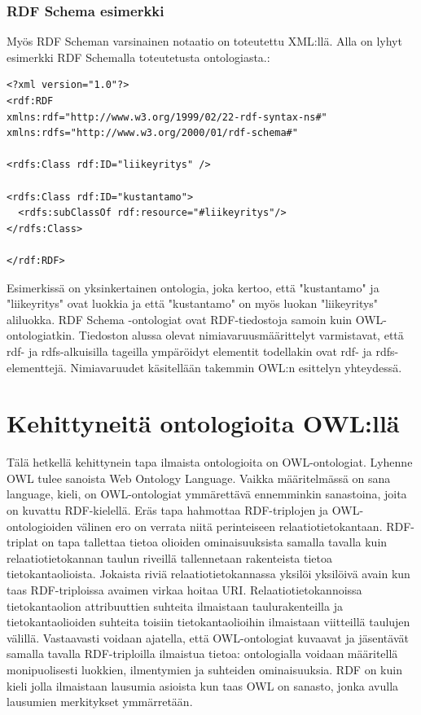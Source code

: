 \documentclass[finnish]{tktltiki2}
\theoremstyle{definition}
\theoremstyle{remark}
\begin{document}
\subsubsection{RDF Schema esimerkki}
Myös RDF Scheman varsinainen notaatio on toteutettu XML:llä. Alla on lyhyt esimerkki RDF Schemalla toteutetusta ontologiasta.: 
\begin{verbatim}
<?xml version="1.0"?>
<rdf:RDF
xmlns:rdf="http://www.w3.org/1999/02/22-rdf-syntax-ns#"
xmlns:rdfs="http://www.w3.org/2000/01/rdf-schema#"

<rdfs:Class rdf:ID="liikeyritys" />

<rdfs:Class rdf:ID="kustantamo">
  <rdfs:subClassOf rdf:resource="#liikeyritys"/>
</rdfs:Class>

</rdf:RDF>
\end{verbatim}

Esimerkissä on yksinkertainen ontologia, joka kertoo, että "kustantamo" ja "liikeyritys" ovat luokkia ja että "kustantamo" on myös luokan "liikeyritys" aliluokka. RDF Schema  -ontologiat ovat RDF-tiedostoja samoin kuin OWL-ontologiatkin. Tiedoston alussa olevat nimiavaruusmäärittelyt varmistavat, että rdf- ja rdfs-alkuisilla tageilla ympäröidyt elementit todellakin ovat rdf- ja rdfs- elementtejä. Nimiavaruudet käsitellään takemmin OWL:n esittelyn yhteydessä. 

\section{Kehittyneitä ontologioita OWL:llä}



Tälä hetkellä kehittynein tapa ilmaista ontologioita on OWL-ontologiat. Lyhenne OWL tulee 
sanoista Web Ontology Language. Vaikka määritelmässä on sana language, kieli, on 
OWL-ontologiat ymmärettävä ennemminkin sanastoina, joita on kuvattu RDF-kielellä.
 Eräs tapa hahmottaa RDF-triplojen ja
OWL-ontologioiden välinen ero on verrata niitä perinteiseen
relaatiotietokantaan. RDF-triplat on tapa tallettaa tietoa olioiden ominaisuuksista samalla tavalla kuin
relaatiotietokannan taulun riveillä tallennetaan rakenteista tietoa tietokantaolioista. Jokaista riviä relaatiotietokannassa
yksilöi yksilöivä avain kun taas RDF-triploissa avaimen virkaa hoitaa URI. Relaatiotietokannoissa tietokantaolion attribuuttien suhteita ilmaistaan taulurakenteilla ja tietokantaolioiden suhteita toisiin tietokantaolioihin ilmaistaan viitteillä taulujen välillä. Vastaavasti voidaan ajatella, että OWL-ontologiat kuvaavat ja jäsentävät  samalla tavalla RDF-triploilla ilmaistua tietoa: ontologialla voidaan määritellä monipuolisesti luokkien, ilmentymien ja suhteiden ominaisuuksia.  RDF on kuin kieli jolla ilmaistaan lausumia asioista kun taas OWL on sanasto, jonka avulla lausumien merkitykset ymmärretään. 
\end{document}
